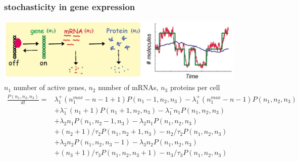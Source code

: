 \begin{frame}
\frametitle{stochasticity in gene expression}
\begin{center}
\includegraphics[width=0.9\textwidth]{fig/stochgeneexpdyn.png}\\
{\scriptsize
$n_1$ number of active genes, $n_2$ number of mRNAs, $n_3$ proteins per cell
\begin{align*}
\frac{P(n_1,n_2,n_3)}{dt} = &\lambda_1^+ (n_1^{max}-n-1 + 1)P(n_1 - 1,n_2,n_3) -\lambda_1^+ (n_1^{max}-n-1)P(n_1,n_2,n_3)\\
&+\lambda_1^- (n_1 + 1)P(n_1 + 1,n_2,n_3) -\lambda_1^- n_1 P(n_1,n_2,n_3)\\
&+\lambda_2 n_1P(n_1,n_2-1,n_3) - \lambda_2 n_1 P(n_1,n_2,n_3)\\
&+(n_2+1)/\tau_2 P(n_1,n_2+1,n_3) - n_2/\tau_2P(n_1,n_2,n_3)\\
&+\lambda_3 n_2 P(n_1,n_2,n_3 - 1) - \lambda_3 n_2 P(n_1,n_2,n_3)\\
&+(n_3 + 1)/\tau_3 P(n_1,n_2,n_3+1) - n_3/\tau_3 P(n_1,n_2,n_3)
\end{align*}}
\end{center}
\end{frame}
